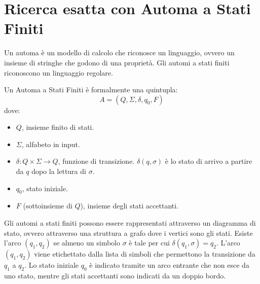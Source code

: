 \section{Ricerca esatta con Automa a Stati Finiti}
Un automa è un modello di calcolo che riconosce un linguaggio, ovvero un insieme
di stringhe che godono di una proprietà. Gli automi a stati finiti riconoscono
un linguaggio regolare.
\begin{definizione} 
    Un Automa a Stati Finiti è formalmente una quintupla:
    \begin{equation}
        A = (Q, \Sigma, \delta, q_0, F)
    \end{equation}
    dove:
    \begin{itemize}
        \item $Q$, insieme finito di stati.
        \item $\Sigma$, alfabeto in input.
        \item $\delta: Q \times \Sigma \to Q$, funzione di transizione.
              $\delta(q,\sigma)$ è lo stato di arrivo a partire da $q$ dopo la
              lettura di $\sigma$.
        \item $q_0$, stato iniziale.
        \item $F$ (sottoinsieme di $Q$), insieme degli stati accettanti.
    \end{itemize}
\end{definizione}
Gli automi a stati finiti possono essere rappresentati attraverso un diagramma di
stato, ovvero attraverso una struttura a grafo dove i vertici sono gli stati.
Esiste l'arco $(q_1,q_2)$ se almeno un simbolo $\sigma$ è tale per cui $\delta
    (q_1,\sigma) = q_2$. L'arco $(q_1,q_2)$ viene etichettato dalla lista di simboli
che permettono la transizione da $q_1$ a $q_2$. Lo stato iniziale $q_0$ è indicato
tramite un arco entrante che non esce da uno stato, mentre gli stati accettanti
sono indicati da un doppio bordo.

